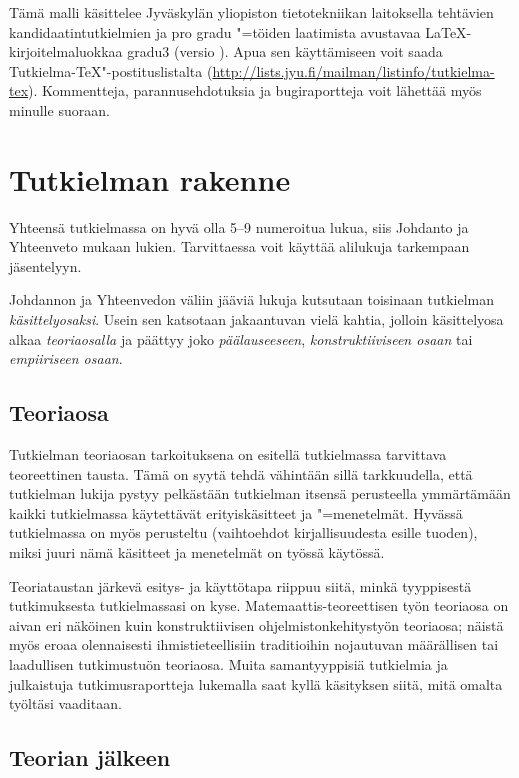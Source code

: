\documentclass[utf8,bachelor]{gradu3}
\begin{document}
Tämä malli käsittelee Jyväskylän yliopiston tietotekniikan laitoksella
tehtävien kandidaatintutkielmien ja pro gradu "=töiden laatimista
avustavaa \LaTeX-kirjoitelmaluokkaa gradu3 (versio \graduclsversion).
Apua sen käyttämiseen voit saada Tutkielma-TeX"-postituslistalta
(\url{http://lists.jyu.fi/mailman/listinfo/tutkielma-tex}).
Kommentteja, parannusehdotuksia ja bugiraportteja voit lähettää myös
minulle suoraan.

\chapter{Tutkielman rakenne}

Yhteensä tutkielmassa on hyvä olla 5--9 numeroitua
lukua, siis Johdanto ja Yhteenveto mukaan lukien.  Tarvittaessa voit
käyttää alilukuja tarkempaan jäsentelyyn.

Johdannon ja Yhteenvedon väliin jääviä lukuja kutsutaan toisinaan
tutkielman \textit{käsittelyosaksi}.  Usein sen katsotaan jakaantuvan
vielä kahtia, jolloin käsittelyosa alkaa \textit{teoriaosalla} ja
päättyy joko \textit{päälauseeseen}, \textit{konstruktiiviseen osaan}
tai \textit{empiiriseen osaan}.

\section{Teoriaosa}

Tutkielman teoriaosan tarkoituksena on esitellä tutkielmassa
tarvittava teoreettinen tausta.  Tämä on syytä tehdä vähintään sillä
tarkkuudella, että tutkielman lukija pystyy pelkästään tutkielman
itsensä perusteella ymmärtämään kaikki tutkielmassa käytettävät
erityiskäsitteet ja "=menetelmät.  Hyvässä tutkielmassa on myös
perusteltu (vaihtoehdot kirjallisuudesta esille tuoden), miksi juuri
nämä käsitteet ja menetelmät on työssä käytössä.

Teoriataustan järkevä esitys- ja käyttötapa riippuu siitä, minkä
tyyppisestä tutkimuksesta tutkielmassasi on kyse.
Matemaattis-teoreettisen työn teoriaosa on aivan eri näköinen kuin
konstruktiivisen ohjelmistonkehitystyön teoriaosa; näistä myös eroaa
olennaisesti ihmistieteellisiin traditioihin nojautuvan määrällisen
tai laadullisen tutkimustuön teoriaosa.  Muita samantyyppisiä
tutkielmia ja julkaistuja tutkimusraportteja lukemalla saat kyllä
käsityksen siitä, mitä omalta työltäsi vaaditaan.

\section{Teorian jälkeen}
\end{document}
